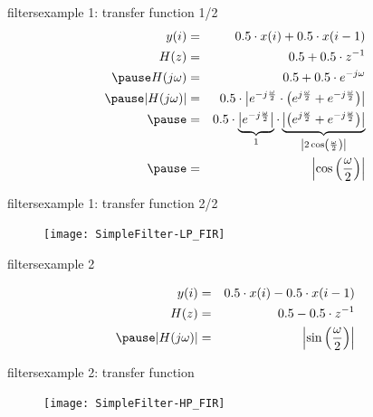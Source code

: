 	\begin{frame}{filters}{example 1: transfer function 1/2}
    	\begin{eqnarray*}
	        		y(i) &=& 0.5\cdot x(i) + 0.5\cdot x(i-1)\\
	        		H(z) &=& 0.5  + 0.5\cdot z^{-1}\\
	       	\pause
	        		H(j\omega) &=& 0.5  + 0.5\cdot e^{-j\omega}\\
	       	\pause
	       			|H(j\omega)| &=&0.5 \cdot \left| e^{-j\frac{\omega}{2}} \cdot \left( e^{j\frac{\omega}{2}} + e^{-j\frac{\omega}{2}}\right)\right| \\
	       	\pause
	       				&=&0.5 \cdot \underbrace{\left| e^{-j\frac{\omega}{2}}\right|}_{1} \cdot  \underbrace{\left|\left( e^{j\frac{\omega}{2}} + e^{-j\frac{\omega}{2}}\right)\right|}_{\left| 2\cos\left(\frac{\omega}{2}\right) \right|} \\
	       	\pause
	       	&=& \left| \cos\left(\frac{\omega}{2}\right) \right|
    	\end{eqnarray*}
	\end{frame}	
	
	\begin{frame}{filters}{example 1: transfer function 2/2}
		\begin{figure}
			\centerline{\texttt{[image: SimpleFilter-LP\_FIR]}}
		\end{figure}
	\end{frame}	
	
	\begin{frame}{filters}{example 2}
        \begin{figure}
			\begin{center}
                
			\end{center}
        \end{figure}
        \pause
    	\begin{eqnarray*}
    		y(i) &=& 0.5\cdot x(i) - 0.5\cdot x(i-1)\\
    		H(z) &=& 0.5  - 0.5\cdot z^{-1}\\
    	\pause
    		|H(j\omega)| &=& \left| \sin\left(\frac{\omega}{2}\right) \right|
    	\end{eqnarray*}
	\end{frame}	
	
	\begin{frame}{filters}{example 2: transfer function}
		\begin{figure}
			\centerline{\texttt{[image: SimpleFilter-HP\_FIR]}}
		\end{figure}
	\end{frame}	
	
